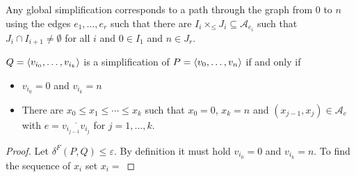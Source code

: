 Any global simplification corresponds to a path through the graph from \(0\) to \(n\) using the edges \(e_1, \dots, e_r\) such that there are \(I_i \times_\leq J_i \subseteq \mathcal{A}_{e_i}\) such that \(J_i \cap I_{i+1} \neq \emptyset\) for all \(i\) and \(0 \in I_1\) and \(n \in J_r\).

\begin{lemma}
	\(Q=\left\langle v_{i_0}, \dots, v_{i_k}\right\rangle\) is a simplification of \(P=\left\langle v_0, \dots, v_n\right\rangle\) if and only if 
	\begin{itemize}
		\item \(v_{i_0} = 0 \) and \(v_{i_k} = n\)
		\item There are \(x_0 \leq x_1 \leq \cdots \leq x_k\) such that \(x_0 = 0\), \(x_k = n\) and \((x_{j-1}, x_j) \in \mathcal{A}_e\) with \(e = \overline{v_{i_{j-1}}v_{i_j}}\) for \(j = 1, \dots, k\).
	\end{itemize}
\end{lemma}

\begin{proof}
	Let \(\delta^F(P, Q) \leq \varepsilon\). By definition it must hold \(v_{i_0} = 0\) and \(v_{i_k} = n\). To find the sequence of \(x_i\) set \(x_i =\)
\end{proof}







